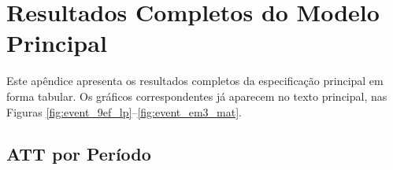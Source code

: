 \chapter{Resultados Completos do Modelo Principal} \label{ap:principal}

Este apêndice apresenta os resultados completos da especificação principal em forma tabular. Os gráficos correspondentes já aparecem no texto principal, nas Figuras \ref{fig:event_9ef_lp}--\ref{fig:event_em3_mat}.

\section{ATT por Período}





